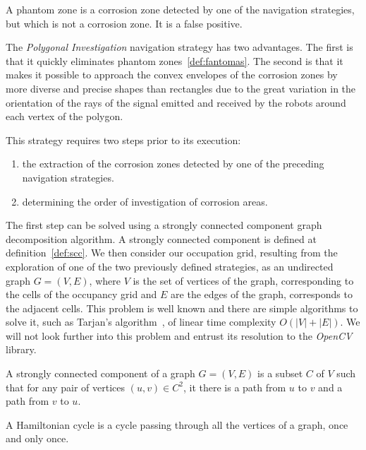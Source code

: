 \begin{definition}
	\label{def:fantomas}
	A phantom zone is a corrosion zone detected by one of the navigation strategies, but which is not a corrosion zone. It is a false positive.
\end{definition}

The \textit{Polygonal Investigation} navigation strategy has two advantages.
The first is that it quickly eliminates phantom zones~\ref{def:fantomas}.
The second is that it makes it possible to approach the convex envelopes of the corrosion zones by more diverse and precise shapes than rectangles due to the great variation in the orientation of the rays of the signal emitted and received by the robots around each vertex of the polygon.

This strategy requires two steps prior to its execution:
\begin{enumerate}
	\item the extraction of the corrosion zones detected by one of the preceding navigation strategies.
	\item determining the order of investigation of corrosion areas.
\end{enumerate}

The first step can be solved using a strongly connected component graph decomposition algorithm.
A strongly connected component is defined at definition~\ref{def:scc}.
We then consider our occupation grid, resulting from the exploration of one of the two previously defined strategies, as an undirected graph $G = (V, E)$, where $V$ is the set of vertices of the graph, corresponding to the cells of the occupancy grid and $E$ are the edges of the graph, corresponds to the adjacent cells.
This problem is well known and there are simple algorithms to solve it, such as Tarjan's algorithm~\cite{enwiki:1148118528}, of linear time complexity $O(|V| + |E|)$.
We will not look further into this problem and entrust its resolution to the \textit{OpenCV} library.

\begin{definition}
	\label{def:scc}
	A strongly connected component of a graph $G = (V, E)$ is a subset $C$ of $V$ such that for any pair of vertices $(u, v) \in C^2$, it there is a path from $u$ to $v$ and a path from $v$ to $u$.
\end{definition}

\begin{definition}
	\label{def:hamilton}
	A Hamiltonian cycle is a cycle passing through all the vertices of a graph, once and only once.
\end{definition}

